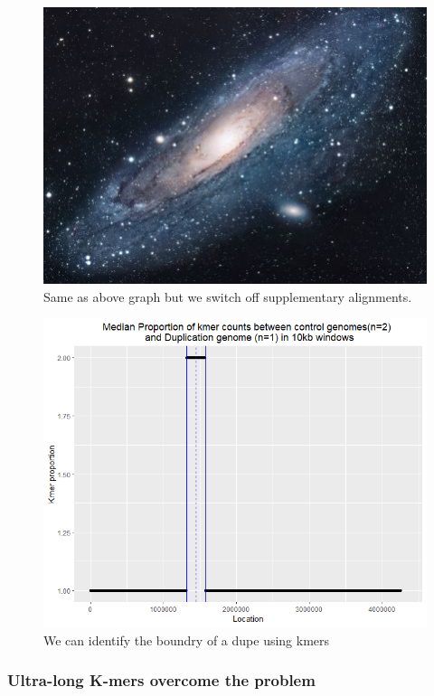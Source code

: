 \documentclass{article}
\begin{document}
 \begin{figure}[h!]
\centering
\includegraphics[scale=0.6]{universe.jpg}
\caption{Same as above graph but we switch off supplementary alignments.}
\label{fig:Kmer_abund_supp_off}
\end{figure}

\begin{figure}[h!]
\centering
\includegraphics[scale=0.6]{Kmer_dupe.png}
\caption{We can identify the boundry of a dupe using kmers}
\label{fig:kmer_dupe1}
\end{figure}



\subsubsection{Ultra-long K-mers overcome the problem}
\end{document}
